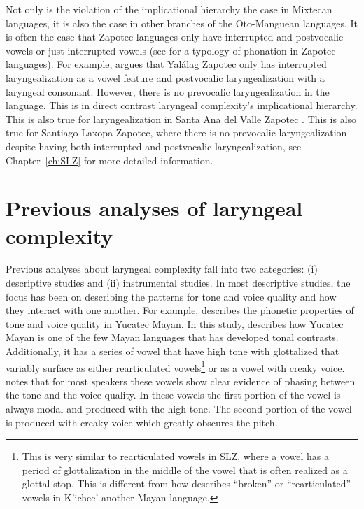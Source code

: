 Not only is the violation of the implicational hierarchy the case in Mixtecan languages, it is also the case in other branches of the Oto-Manguean languages. It is often the case that Zapotec languages only have interrupted and postvocalic vowels or just interrupted vowels (see \cite{ariza-garciaPhonationTypesTones2018} for a typology of phonation in Zapotec languages). For example, \citet{avelinoTopicsYalalagZapotec2004,avelinoAcousticElectroglottographicAnalyses2010} argues that Yalálag Zapotec only has interrupted laryngealization as a vowel feature and postvocalic laryngealization with a laryngeal consonant. However, there is no prevocalic laryngealization in the language. This is in direct contrast laryngeal complexity's implicational hierarchy. This is also true for laryngealization in Santa Ana del Valle Zapotec \citep{espositoSantaAnaValle2004,espositoAcousticElectroglottographicStudy2012}. This is also true for Santiago Laxopa Zapotec, where there is no prevocalic laryngealization despite having both interrupted and postvocalic laryngealization, see Chapter~\ref{ch:SLZ} for more detailed information.

\section{Previous analyses of laryngeal complexity}\label{sec:previous_analyses}

Previous analyses about laryngeal complexity fall into two categories: (i) descriptive studies and (ii) instrumental studies. In most descriptive studies, the focus has been on describing the patterns for tone and voice quality and how they interact with one another. For example, \citet{frazierPhoneticsYucatecMaya2013} describes the phonetic properties of tone and voice quality in Yucatec Mayan. In this study, \citeauthor{frazierPhoneticsYucatecMaya2013} describes how Yucatec Mayan is one of the few Mayan languages that has developed tonal contrasts. Additionally, it has a series of vowel that have high tone with glottalized that variably surface as either rearticulated vowels\footnote{This is very similar to rearticulated vowels in SLZ, where a vowel has a period of glottalization in the middle of the vowel that is often realized as a glottal stop. This is different from how \citet{bairdPhoneticPhonologicalRealizations2011} describes ``broken'' or ``rearticulated'' vowels in K'ichee' another Mayan language.} or as a vowel with creaky voice. \citeauthor{frazierPhoneticsYucatecMaya2013} notes that for most speakers these vowels show clear evidence of phasing between the tone and the voice quality. In these vowels the first portion of the vowel is always modal and produced with the high tone. The second portion of the vowel is produced with creaky voice which greatly obscures the pitch. 


